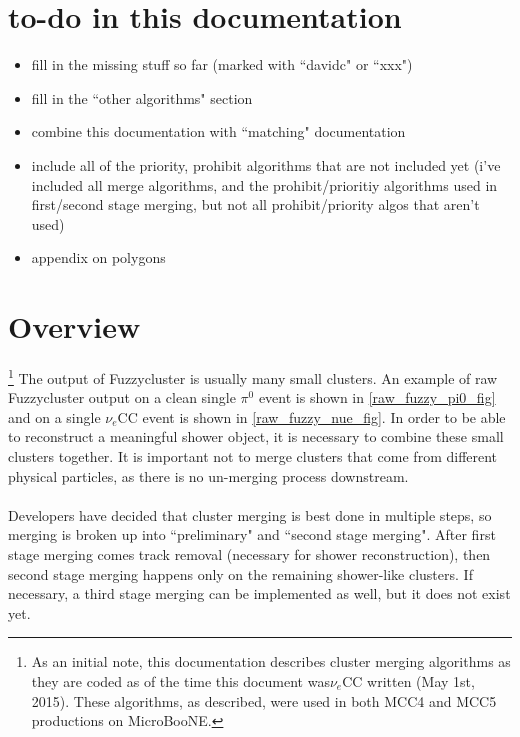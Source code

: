 \documentclass{article}
\title{\myTitle}
\author{\myAuthorName}
\date{\today}
\begin{document}
\maketitle

\section{to-do in this documentation}
\begin{itemize}
\item fill in the missing stuff so far (marked with ``davidc" or ``xxx")
\item fill in the ``other algorithms" section
\item combine this documentation with ``matching" documentation
\item include all of the priority, prohibit algorithms that are not included yet (i've included all merge algorithms, and the prohibit/prioritiy algorithms used in first/second stage merging, but not all prohibit/priority algos that aren't used)
\item appendix on polygons
\end{itemize}

\section{Overview}
\footnote{As an initial note, this documentation describes cluster merging algorithms as they are coded as of the time this document was$\nu_e$CC written (May 1st, 2015). These algorithms, as described, were used in both MCC4 and MCC5 productions on MicroBooNE.} The output of Fuzzycluster is usually many small clusters. An example of raw Fuzzycluster output on a clean single $\pi^0$ event is shown in \autoref{raw_fuzzy_pi0_fig} and on a single $\nu_e$CC event is shown in \autoref{raw_fuzzy_nue_fig}. In order to be able to reconstruct a meaningful shower object, it is necessary to combine these small clusters together. It is important not to merge clusters that come from different physical particles, as there is no un-merging process downstream. \\\\
\indent Developers have decided that cluster merging is best done in multiple steps, so merging is broken up into ``preliminary" and ``second stage merging". After first stage merging comes track removal (necessary for shower reconstruction), then second stage merging happens only on the remaining shower-like clusters. If necessary, a third stage merging can be implemented as well, but it does not exist yet.
\end{document}
